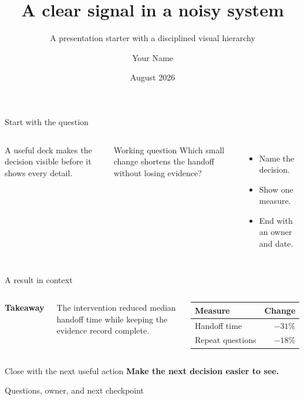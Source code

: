 \documentclass[aspectratio=169,10pt]{beamer}
\title{A clear signal in a noisy system}
\subtitle{A presentation starter with a disciplined visual hierarchy}
\author{Your Name}
\institute{Your Organisation}
\date{August 2026}
\begin{document}
\begin{frame}[plain]\maketitle\end{frame}

\begin{frame}{Start with the question}
  \begin{columns}[T,onlytextwidth]
    A useful deck makes the decision visible before it shows every detail.
    \begin{block}{Working question}
      Which small change shortens the handoff without losing evidence?
    \end{block}
    \begin{itemize}
      \item Name the decision.
      \item Show one measure.
      \item End with an owner and date.
    \end{itemize}
  \end{columns}
\end{frame}

\begin{frame}{A result in context}
  \begin{columns}[T,onlytextwidth]
    \textbf{Takeaway}\par\medskip
    The intervention reduced median handoff time while keeping the evidence
    record complete.
    \medskip
    \begin{tabular}{@{}lr@{}}\toprule
    Measure & Change\\\midrule
    Handoff time & $-31\%$\\
    Repeat questions & $-18\%$\\
    \bottomrule\end{tabular}
  \end{columns}
\end{frame}

\begin{frame}{Close with the next useful action}
  \centering\vfill
  \LARGE\textbf{Make the next decision easier to see.}\par
  \vspace{.5cm}\normalsize
  Questions, owner, and next checkpoint\vfill
\end{frame}
\end{document}
